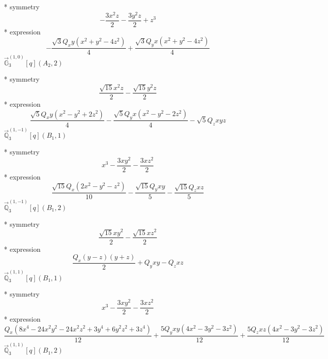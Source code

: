 \documentclass[fleqn,8pt]{jsarticle}
\begin{document}
\noindent\quad ** symmetry
\begin{dmath*}
- \frac{3 x^{2} z}{2} - \frac{3 y^{2} z}{2} + z^{3}
\end{dmath*}
\noindent\quad ** expression
\begin{dmath*}
- \frac{\sqrt{3} Q_{x} y \left(x^{2} + y^{2} - 4 z^{2}\right)}{4} + \frac{\sqrt{3} Q_{y} x \left(x^{2} + y^{2} - 4 z^{2}\right)}{4}
\end{dmath*}
\noindent\quad $\vec{\mathbb{G}}_{3}^{(1,0)}[q](A_{2},2)$

\noindent\quad ** symmetry
\begin{dmath*}
\frac{\sqrt{15} x^{2} z}{2} - \frac{\sqrt{15} y^{2} z}{2}
\end{dmath*}
\noindent\quad ** expression
\begin{dmath*}
\frac{\sqrt{5} Q_{x} y \left(x^{2} - y^{2} + 2 z^{2}\right)}{4} - \frac{\sqrt{5} Q_{y} x \left(x^{2} - y^{2} - 2 z^{2}\right)}{4} - \sqrt{5} Q_{z} x y z
\end{dmath*}
\noindent\quad $\vec{\mathbb{Q}}_{3}^{(1,-1)}[q](B_{1},1)$

\noindent\quad ** symmetry
\begin{dmath*}
x^{3} - \frac{3 x y^{2}}{2} - \frac{3 x z^{2}}{2}
\end{dmath*}
\noindent\quad ** expression
\begin{dmath*}
\frac{\sqrt{15} Q_{x} \left(2 x^{2} - y^{2} - z^{2}\right)}{10} - \frac{\sqrt{15} Q_{y} x y}{5} - \frac{\sqrt{15} Q_{z} x z}{5}
\end{dmath*}
\noindent\quad $\vec{\mathbb{Q}}_{3}^{(1,-1)}[q](B_{1},2)$

\noindent\quad ** symmetry
\begin{dmath*}
\frac{\sqrt{15} x y^{2}}{2} - \frac{\sqrt{15} x z^{2}}{2}
\end{dmath*}
\noindent\quad ** expression
\begin{dmath*}
\frac{Q_{x} \left(y - z\right) \left(y + z\right)}{2} + Q_{y} x y - Q_{z} x z
\end{dmath*}
\noindent\quad $\vec{\mathbb{Q}}_{3}^{(1,1)}[q](B_{1},1)$

\noindent\quad ** symmetry
\begin{dmath*}
x^{3} - \frac{3 x y^{2}}{2} - \frac{3 x z^{2}}{2}
\end{dmath*}
\noindent\quad ** expression
\begin{dmath*}
\frac{Q_{x} \left(8 x^{4} - 24 x^{2} y^{2} - 24 x^{2} z^{2} + 3 y^{4} + 6 y^{2} z^{2} + 3 z^{4}\right)}{12} + \frac{5 Q_{y} x y \left(4 x^{2} - 3 y^{2} - 3 z^{2}\right)}{12} + \frac{5 Q_{z} x z \left(4 x^{2} - 3 y^{2} - 3 z^{2}\right)}{12}
\end{dmath*}
\noindent\quad $\vec{\mathbb{Q}}_{3}^{(1,1)}[q](B_{1},2)$
\end{document}
